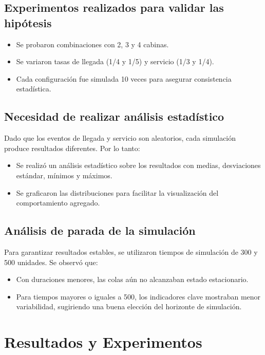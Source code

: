 \documentclass[12pt]{article}
\begin{document}
\subsection*{Experimentos realizados para validar las hipótesis}
\begin{itemize}
    \item Se probaron combinaciones con 2, 3 y 4 cabinas.
    \item Se variaron tasas de llegada (1/4 y 1/5) y servicio (1/3 y 1/4).
    \item Cada configuración fue simulada 10 veces para asegurar consistencia estadística.
\end{itemize}

\subsection*{Necesidad de realizar análisis estadístico}
Dado que los eventos de llegada y servicio son aleatorios, cada simulación produce resultados diferentes. Por lo tanto:
\begin{itemize}
    \item Se realizó un análisis estadístico sobre los resultados con medias, desviaciones estándar, mínimos y máximos.
    \item Se graficaron las distribuciones para facilitar la visualización del comportamiento agregado.
\end{itemize}

\subsection*{Análisis de parada de la simulación}
Para garantizar resultados estables, se utilizaron tiempos de simulación de 300 y 500 unidades. Se observó que:
\begin{itemize}
    \item Con duraciones menores, las colas aún no alcanzaban estado estacionario.
    \item Para tiempos mayores o iguales a 500, los indicadores clave mostraban menor variabilidad, sugiriendo una buena elección del horizonte de simulación.
\end{itemize}
\newpage

\section{Resultados y Experimentos}
\end{document}
